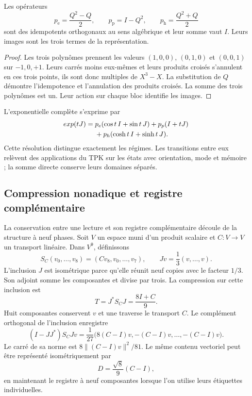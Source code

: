 \begin{proposicion}
\label{eul:prop:proyectores}
Les opérateurs
\[
 p_{\mathrm e}=\frac{Q^2-Q}{2},\qquad
 p_{\mathrm p}=I-Q^2,\qquad
 p_{\mathrm h}=\frac{Q^2+Q}{2}
\]
sont des idempotents orthogonaux au sens algébrique et leur somme vaut \(I\).
Leurs images sont les trois termes de la représentation.
\end{proposicion}
\begin{proof}
Les trois polynômes prennent les valeurs \((1,0,0)\), \((0,1,0)\) et
\((0,0,1)\) sur \(-1,0,+1\). Leurs carrés moins eux-mêmes et
leurs produits croisés s’annulent en ces trois points, ils sont donc
multiples de \(X^3-X\). La substitution de \(Q\) démontre l’idempotence et
l’annulation des produits croisés. La somme des trois polynômes
est un. Leur action sur chaque bloc identifie les images.
\end{proof}

L’exponentielle complète s’exprime par
\begin{align}
 \exp(t\mathbb J)={}&p_{\mathrm e}(\cos t\,I+\sin t\,\mathbb J)
 +p_{\mathrm p}(I+t\mathbb J)\notag\\
 &+p_{\mathrm h}(\cosh t\,I+\sinh t\,\mathbb J).
\end{align}
Cette résolution distingue exactement les régimes. Les transitions
entre eux relèvent des applications du TPK sur les états avec orientation,
mode et mémoire ; la somme directe conserve leurs domaines séparés.

\subsection{Compression nonadique et registre complémentaire}
\label{eul:compresion}

La conservation entre une lecture et son registre complémentaire découle
de la structure à neuf phases. Soit \(V\) un espace muni d’un produit
scalaire et \(C:V\to V\) un transport linéaire. Dans \(V^9\), définissons
\[
 S_C(v_0,\ldots,v_8)=(Cv_8,v_0,\ldots,v_7),
 \qquad Jv=\frac13(v,\ldots,v).
\]
L’inclusion \(J\) est isométrique parce qu’elle réunit neuf copies avec le facteur
\(1/3\). Son adjoint somme les composantes et divise par trois. La
compression sur cette inclusion est
\[
 T=J^*S_CJ=\frac{8I+C}{9}.
\]
Huit composantes conservent \(v\) et une traverse le transport \(C\).
Le complément orthogonal de l’inclusion enregistre
\[
 (I-JJ^*)S_CJv
 =\frac1{27}\bigl(8(C-I)v,-(C-I)v,\ldots,-(C-I)v\bigr).
\]
Le carré de sa norme est
\(8\|(C-I)v\|^2/81\). Le même contenu vectoriel peut être représenté
isométriquement par
\[
 D=\frac{\sqrt8}{9}(C-I),
\]
en maintenant le registre à neuf composantes lorsque l’on utilise leurs
étiquettes individuelles.

